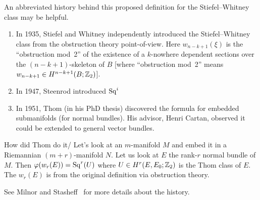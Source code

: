 \begin{remark}[History]
An abbreviated history behind this proposed definition for the
Stiefel--Whitney class may be helpful.
\begin{enumerate}
\item In 1935, Stiefel and Whitney independently introduced the
  Stiefel--Whitney class from the obstruction theory
  point-of-view. Here $w_{n-k+1}(\xi)$ is the ``obstruction mod~2'' of
  the existence of a $k$-nowhere dependent sections over the
  $(n-k+1)$-skeleton of $B$ [where ``obstruction mod~2'' means
    $w_{n-k+1}\in H^{n-k+1}(B;\mathbb{Z}_{2})$].
\item In 1947, Steenrod introduced $\operatorname{Sq}^{i}$
\item In 1951, Thom (in his PhD thesis) discovered the formula for
  embedded submanifolds (for normal bundles). His advisor, Henri
  Cartan, observed it could be extended to general vector bundles.
\end{enumerate}
How did Thom do it/ Let's look at an $m$-manifold $M$ and embed it in
a Riemannian $(m+r)$-manifold $N$. Let us look at $E$ the rank-$r$
normal bundle of $M$. Then $\varphi(w_{r}(E))=\operatorname{Sq}^{r}(U)$ where $U\in H^{r}(E,E_{0};\mathbb{Z}_{2})$
is the Thom class of $E$. The $w_{r}(E)$ is from the original
definition via obstruction theory.

See Milnor and Stasheff~\cite[Ch~12]{milnor1974characteristic} for
more details about the history.
\end{remark}

